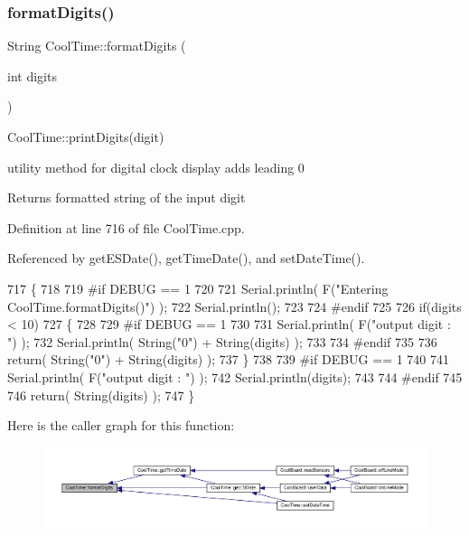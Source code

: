 \subsubsection{\texorpdfstring{format\+Digits()}{formatDigits()}}
{\footnotesize\ttfamily String Cool\+Time\+::format\+Digits (\begin{DoxyParamCaption}\item[{int}]{digits }\end{DoxyParamCaption})}

Cool\+Time\+::print\+Digits(digit)

utility method for digital clock display adds leading 0

\begin{DoxyReturn}{Returns}
formatted string of the input digit 
\end{DoxyReturn}


Definition at line 716 of file Cool\+Time.\+cpp.



Referenced by get\+E\+S\+Date(), get\+Time\+Date(), and set\+Date\+Time().


\begin{DoxyCode}
717 \{
718 
719 \textcolor{preprocessor}{#if DEBUG == 1 }
720 
721     Serial.println( F(\textcolor{stringliteral}{"Entering CoolTime.formatDigits()"}) );
722     Serial.println();
723 
724 \textcolor{preprocessor}{#endif }
725 
726     \textcolor{keywordflow}{if}(digits < 10)
727     \{
728     
729 \textcolor{preprocessor}{    #if DEBUG == 1}
730 
731         Serial.println( F(\textcolor{stringliteral}{"output digit : "}) );
732         Serial.println( String(\textcolor{stringliteral}{"0"}) + String(digits) );
733 
734 \textcolor{preprocessor}{    #endif}
735 
736         \textcolor{keywordflow}{return}( String(\textcolor{stringliteral}{"0"}) + String(digits) );
737     \}
738     
739 \textcolor{preprocessor}{#if DEBUG == 1 }
740 
741     Serial.println( F(\textcolor{stringliteral}{"output digit : "}) );
742     Serial.println(digits);
743 
744 \textcolor{preprocessor}{#endif}
745 
746     \textcolor{keywordflow}{return}( String(digits) );
747 \}
\end{DoxyCode}
Here is the caller graph for this function\+:
\nopagebreak
\begin{figure}[H]
\begin{center}
\leavevmode
\includegraphics[width=350pt]{classCoolTime_acd537cd4210d7bde4e1f5c47d2ac0456_icgraph}
\end{center}
\end{figure}
\mbox{\label{classCoolTime_ac4f32ee513c1328d984306645e8785a4}} 
